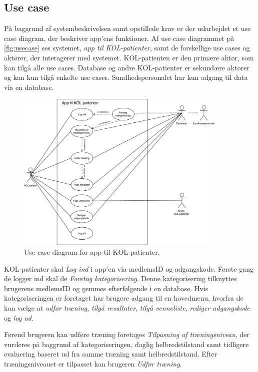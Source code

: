 \subsection{Use case} \label{sec:usecase} 
På baggrund af systembeskrivelsen samt opstillede krav er der udarbejdet et use case diagram, der beskriver app'ens funktioner. Af use case diagrammet på \autoref{fig:usecase} ses systemet, \textit{app til KOL-patienter}, samt de forskellige use cases og aktører, der interagerer med systemet. KOL-patienten er den primære aktør, som kan tilgå alle use cases. Database og andre KOL-patienter er sekundære aktører og kan kun tilgå enkelte use cases. Sundhedspersonalet har kun adgang til data via en database. 

\begin{figure} [H]
\centering
\includegraphics[width=0.9\textwidth]{figures/aktivitetsdiagram/Usecase}
\caption{Use case diagram for app til KOL-patienter.}
\label{fig:usecase}
\end{figure}

\noindent
KOL-patienter skal \textit{Log ind} i app'en via medlemsID og adgangskode. Første gang de logger ind skal de \textit{Foretag kategorisering}. Denne kategorisering tilknyttes brugerens medlemsID og gemmes efterfølgende i en database.
Hvis kategoriseringen er foretaget har brugere adgang til en hovedmenu, hvorfra de kan vælge at \textit{udfør træning}, \textit{tilgå resultater}, \textit{tilgå venneliste}, \textit{rediger adgangskode} og \textit{log ud}. 

Førend brugeren kan udføre træning foretages \textit{Tilpasning af træningsniveau}, der vurderes på baggrund af kategoriseringen, daglig helbredstilstand samt tidligere evaluering baseret ud fra samme træning samt helbredstilstand. Efter træningsniveauet er tilpasset kan brugeren \textit{Udfør træning}.

